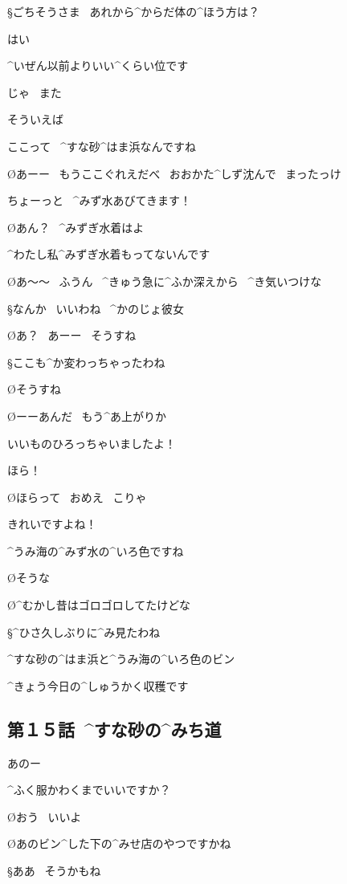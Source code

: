 \S ごちそうさま
\ あれから^{からだ}{体}の^{ほう}{方}は？

\A はい

\A ^{いぜん}{以前}よりいい^{くらい}{位}です

\A じゃ
\ また

\page
\A そういえば

\A ここって
\ ^{すな}{砂}^{はま}{浜}なんですね

\O あーー
\ もうここぐれえだべ
\ おおかた^{しず}{沈}んで
\ まったっけ

\A ちょーっと
\ ^{みず}{水}あびてきます！

\O あん？
\ ^{みずぎ}{水着}はよ

\A ^{わたし}{私}^{みずぎ}{水着}もってないんです

\O あ〜〜
\ ふうん
\ ^{きゅう}{急}に^{ふか}{深}えから
\ ^{き}{気}いつけな

\page[106]
\S なんか
\ いいわね
\ ^{かのじょ}{彼女}

\O あ？
\ あーー
\ そうすね

\S ここも^{か}{変}わっちゃったわね

\O そうすね

\page
\O ーーあんだ
\ もう^{あ}{上}がりか

\A いいものひろっちゃいましたよ！

\A ほら！

\O ほらって
\ おめえ
\ こりゃ

\A きれいですよね！

\A ^{うみ}{海}の^{みず}{水}の^{いろ}{色}ですね

\page
\O そうな

\O ^{むかし}{昔}はゴロゴロしてたけどな

\S ^{ひさ}{久}しぶりに^{み}{見}たわね

\A ^{すな}{砂}の^{はま}{浜}と^{うみ}{海}の^{いろ}{色}のビン

\A ^{きょう}{今日}の^{しゅうかく}{収穫}です


\subsection{第１５話\ ^{すな}{砂}の^{みち}{道}}

\page[110]
\A あのー

\A ^{ふく}{服}かわくまでいいですか？

\O おう
\ いいよ

\page
\O あのビン^{した}{下}の^{みせ}{店}のやつですかね

\S ああ
\ そうかもね

